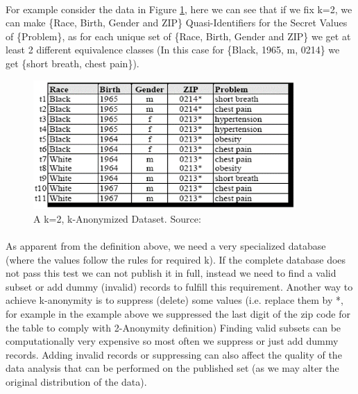 \documentclass[12pt]{report}
\theoremstyle{named}
\begin{document}
\paragraph{}
For example consider the data in Figure \ref{fig:kAon=2}, here we can see that if we fix k=2, we can make \{Race, Birth, Gender and ZIP\} Quasi-Identifiers for the Secret Values of \{Problem\}, as for each unique set of \{Race, Birth, Gender and ZIP\} we get at least 2 different equivalence classes (In this case for \{Black, 1965, m, 0214\} we get \{short breath, chest pain\}).
\begin{figure}[ht]
\centering
        \includegraphics[width=100mm,scale=0.5]{Images/k2Diversified.png}
    \caption{A k=2, k-Anonymized Dataset. Source:\cite{sweeney2002k}}
    \label{fig:kAon=2}
\end{figure}

\paragraph{}
As apparent from the definition above, we need a very specialized database (where the values follow the rules for required k). If the complete database does not pass this test we can not publish it in full, instead we need to find a valid subset or add dummy (invalid) records to fulfill this requirement. Another way to achieve k-anonymity is to suppress (delete) some values (i.e. replace them by *, for example in the example above we suppressed the last digit of the zip code for the table to comply with 2-Anonymity definition) Finding valid subsets can be computationally very expensive so most often we suppress or just add dummy records. Adding invalid records or suppressing can also affect the quality of the data analysis that can be performed on the published set (as we may alter the original distribution of the data).
\end{document}
